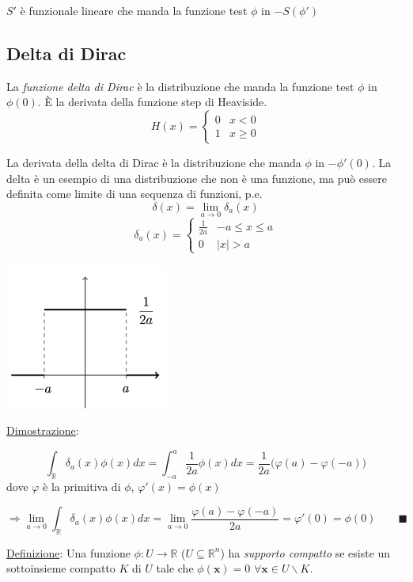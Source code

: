 \documentclass[a4paper,11pt]{report}
\newcommand{\R}{\mathbb{R}}
\newcommand{\Rn}{\mathbb{R}^n}
\newcommand{\x}{\boldsymbol{x}}
\begin{document}
$S'$ \`e funzionale lineare che manda la funzione test $\phi$ in $-S\left(\phi'\right)$

\subsection{Delta di Dirac}
La \emph{funzione delta di Dirac} \`e la distribuzione che manda la funzione test $\phi$ in $\phi(0)$. \`E la derivata della funzione step di Heaviside.
\[
H(x)=\begin{cases}
0 & x < 0 \\
1 & x \geq 0
\end{cases}
\]

La derivata della delta di Dirac \`e la distribuzione che manda $\phi$ in $-\phi '(0)$. La delta \`e un esempio di una distribuzione che non \`e una funzione, ma pu\`o essere definita come limite di una sequenza di funzioni, p.e.
\[
\delta\left(x\right) = \lim_{a\to 0}\delta_a\left(x\right)
\]
\[
\delta_a(x) = \begin{cases}
\frac{1}{2a} & -a\leq x\leq a\\
0 & |x| > a
\end{cases}
\]

\begin{center}
\includegraphics[width=0.4\textwidth]{immagini/grafico1}
\end{center}

\underline{Dimostrazione}:

\[
\int_\R \delta_a (x)\phi(x) dx= \int_{-a}^{a}\frac{1}{2a}\phi(x) dx = \frac{1}{2a}\big(\varphi(a)-\varphi(-a)\big)
\]
dove $\varphi$ \`e la primitiva di $\phi$, $\varphi'(x)=\phi(x)$

\[
\Rightarrow \lim_{a\to 0}\int_{\R}\delta_a(x)\phi(x)dx=\lim_{a\to 0}\frac{\varphi(a)-\varphi(-a)}{2a}=\varphi'(0)=\phi(0) \qquad\blacksquare
\]

\bigskip

\underline{Definizione}: Una funzione $\phi : U \rightarrow \mathbb{R}$ ($U\subseteq \Rn$) ha \emph{supporto compatto} se esiste un sottoinsieme compatto $K$ di $U$ tale che $\phi(\x)=0$ $\forall \x \in U\smallsetminus K$.
\end{document}
